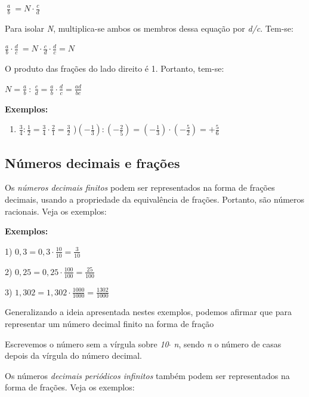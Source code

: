\quad  \( ~\frac{a}{b}~ =N  \cdot  \frac{c}{d} \) 

Para isolar \textit{N}, multiplica-se ambos os membros dessa equação por \textit{d/c}. Tem-se:

\quad  \( \frac{a}{b} \cdot  \frac{d}{c}~ =N  \cdot  \frac{c}{d} \cdot  \frac{d}{c}=N \) 

O produto das frações do lado direito é 1. Portanto, tem-se:

\quad  \( N=\frac{a}{b}~:~\frac{c}{d}= \frac{a}{b} \cdot  \frac{d}{c} =\frac{ad}{bc}~ \) ~~~ \qedsymbol{}\quad 

\textbf{Exemplos:}

\begin{enumerate}
	\item  \( \frac{3}{4}:\frac{1}{2}=\frac{3}{4} \cdot \frac{2}{1}=\frac{3}{2} \) \quad {})\(  \left( -\frac{1}{3} \right) : \left( -\frac{2}{5} \right) = \left( -\frac{1}{3} \right)  \cdot  \left( -\frac{5}{2} \right) =+\frac{5}{6} \)
\end{enumerate}

\subsection{Números decimais e frações }

Os \textit{números decimais finitos} podem ser representados na forma de frações decimais, usando a propriedade da equivalência de frações. Portanto, são números racionais. Veja os exemplos:

\textbf{Exemplos:}

1)  \( 0,3=0,3 \cdot \frac{10}{10}=\frac{3}{10}~~ \) \quad \quad \quad \quad 

2)  \( 0,25=0,25 \cdot \frac{100}{100}=\frac{25}{100}~~ \)  \quad \quad \quad \quad 

3)  \( 1,302=1,302 \cdot \frac{1000}{1000}=\frac{1302}{1000}~~ \) ~~~~ 

Generalizando a ideia apresentada nestes exemplos, podemos afirmar que para representar um número decimal finito na forma de fração

\begin{caixa}
\begin{Center}
Escrevemos o número sem a vírgula sobre \textit{10$ \cdot $ n}, sendo \textit{n} o número de casas depois da vírgula do número decimal.
\end{Center}
\end{caixa}

Os números \textit{decimais periódicos infinitos} também podem ser representados na forma de frações. Veja os exemplos:

